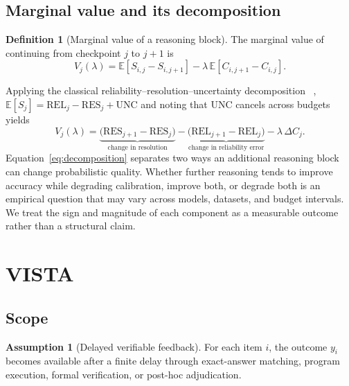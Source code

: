 \documentclass[a4paper,fleqn]{cas-sc}
\newcommand{\Brier}{S}
\newcommand{\cost}{C}
\newcommand{\margval}{V}
\newcommand{\Exp}{\mathbb{E}}
\theoremstyle{plain}
\theoremstyle{definition}
\newtheorem{definition}{Definition}
\newtheorem{assumption}{Assumption}
\theoremstyle{remark}
\begin{document}
\subsection{Marginal value and its decomposition}

\begin{definition}[Marginal value of a reasoning block]
The marginal value of continuing from checkpoint $j$ to $j+1$ is
\begin{equation}
  \margval_j(\lambda)
  =
  \Exp\!\left[\Brier_{i,j}-\Brier_{i,j+1}\right]
  -\lambda\,\Exp\!\left[\cost_{i,j+1}-\cost_{i,j}\right].
\end{equation}
\end{definition}

Applying the classical reliability--resolution--uncertainty decomposition
~\cite{murphy1973new},
$\Exp[\Brier_j] = \mathrm{REL}_j - \mathrm{RES}_j + \mathrm{UNC}$
and noting that UNC cancels across budgets yields
\begin{equation}
  \margval_j(\lambda)
  =
  \underbrace{\bigl(\mathrm{RES}_{j+1}-\mathrm{RES}_j\bigr)}_{\text{change in resolution}}
  -
  \underbrace{\bigl(\mathrm{REL}_{j+1}-\mathrm{REL}_j\bigr)}_{\text{change in reliability error}}
  -\lambda\,\Delta\cost_j.
  \label{eq:decomposition}
\end{equation}
Equation~\eqref{eq:decomposition} separates two ways an additional reasoning
block can change probabilistic quality. Whether further reasoning tends to
improve accuracy while degrading calibration, improve both, or degrade both is
an empirical question that may vary across models, datasets, and budget
intervals. We treat the sign and magnitude of each component as a measurable
outcome rather than a structural claim.

\section{VISTA}
\label{sec:method}

\subsection{Scope}

\begin{assumption}[Delayed verifiable feedback]
\label{asm:feedback}
For each item $i$, the outcome $y_i$ becomes available after a finite delay
through exact-answer matching, program execution, formal verification, or
post-hoc adjudication.
\end{assumption}
\end{document}
